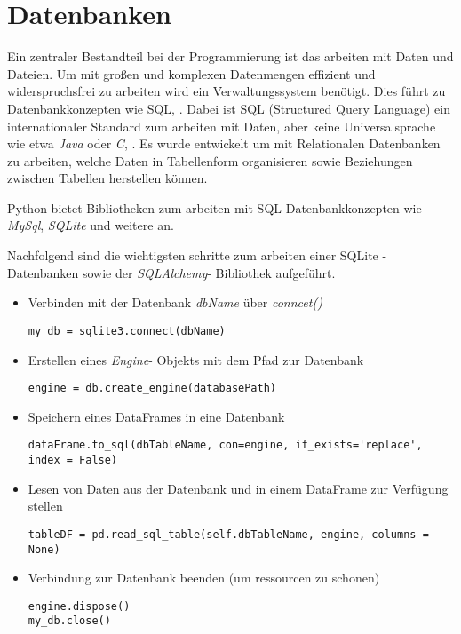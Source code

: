\chapter{Datenbanken}

Ein zentraler Bestandteil bei der Programmierung ist das arbeiten mit Daten und Dateien. Um mit großen und komplexen Datenmengen effizient und widerspruchsfrei zu arbeiten wird ein Verwaltungssystem benötigt. Dies führt zu Datenbankkonzepten wie SQL, \cite{Steyer:2018}.
Dabei ist SQL (Structured Query Language) ein internationaler Standard zum arbeiten mit Daten, aber keine Universalsprache wie etwa \textit{Java} oder \textit{C}, \cite{Taylor:2023}. Es wurde entwickelt um mit Relationalen Datenbanken zu arbeiten, welche Daten in Tabellenform organisieren sowie Beziehungen zwischen Tabellen herstellen können.

Python bietet Bibliotheken zum arbeiten mit SQL Datenbankkonzepten wie \textit{MySql}, \textit{SQLite} und weitere an.

Nachfolgend sind die wichtigsten schritte zum arbeiten einer SQLite - Datenbanken sowie der \textit{SQLAlchemy}- Bibliothek aufgeführt.
\begin{itemize}
	\itemsep0pt
	\item Verbinden mit der Datenbank \textit{dbName} über \textit{conncet()}
	\begin{lstlisting}
my_db = sqlite3.connect(dbName)
	\end{lstlisting}
	\item Erstellen eines \textit{Engine}- Objekts mit dem Pfad zur Datenbank 
	\begin{lstlisting}
engine = db.create_engine(databasePath)
	\end{lstlisting}
	\item Speichern eines DataFrames in eine Datenbank
	\begin{lstlisting}
dataFrame.to_sql(dbTableName, con=engine, if_exists='replace', index = False)
	\end{lstlisting}
	\item Lesen von Daten aus der Datenbank und in einem DataFrame zur Verfügung stellen
	\begin{lstlisting}
tableDF = pd.read_sql_table(self.dbTableName, engine, columns = None)
	\end{lstlisting}
	\item Verbindung zur Datenbank beenden (um ressourcen zu schonen)
	\begin{lstlisting}
engine.dispose()
my_db.close()
	\end{lstlisting}
	
\end{itemize}